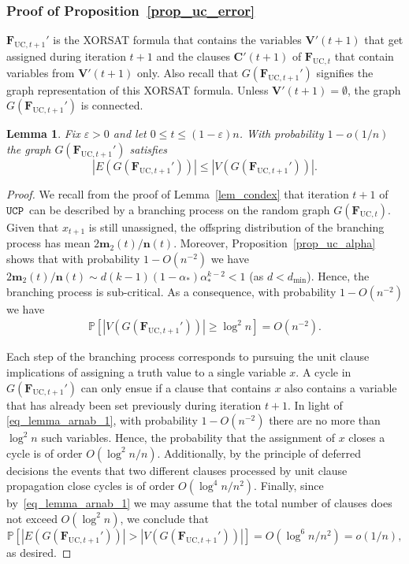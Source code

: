 \documentclass[10pt,reqno]{amsart}
\numberwithin{equation}{section}
\renewcommand{\vec}[1]{\boldsymbol{#1}}
\newcommand\dmin{d_{\mathrm{min}}}
\newcommand{\FUC}[1]{\PHI_{\mathrm{UC},{#1}}}
\newcommand{\UCP}{\ensuremath{\mathtt{UCP}}}
\newcommand\PHI{\vec F}
\newcommand\vC{\vec C}
\newcommand\vV{\vec V}
\newcommand\vm{\vec m}
\newcommand\vn{\vec n}
\newcommand\eps{\varepsilon}
\newcommand\brk[1]{\left\lbrack{#1}\right\rbrack}
\newcommand\pr{\mathbb{P}}
\newcommand\Lem{Lemma}
\newcommand\Prop{Proposition}
\newtheorem{lemma}[definition]{Lemma}
\def\pr{{\mathbb P}}
\begin{document}
\subsubsection{Proof of \Prop~\ref{prop_uc_error}}\label{sec_prop_uc_error}
$\FUC{t+1}'$ is the XORSAT formula that contains the variables $\vV'(t+1)$ that get assigned during iteration $t+1$ and the clauses $\vC'(t+1)$ of $\FUC{t}$ that contain variables from $\vV'(t+1)$ only.
Also recall that $G(\FUC{t+1}')$ signifies the graph representation of this XORSAT formula.
Unless $\vV'(t+1)=\emptyset$, the graph $G(\FUC{t+1}')$ is connected.

\begin{lemma}\label{lemma_arnab}
	Fix $\eps>0$ and let $0\leq t\leq(1-\eps)n$.
	With probability $1-o(1/n)$ the graph $G(\FUC{t+1}')$ satisfies 
			$$|E(G(\FUC{t+1}'))|\leq|V(G(\FUC{t+1}'))|.$$
\end{lemma}
\begin{proof}
	We recall from the proof of \Lem~\ref{lem_condex} that iteration $t+1$ of \UCP\ can be described by a branching process on the random graph $G(\FUC t)$.
	Given that $x_{t+1}$ is still unassigned, the offspring distribution of the branching process has mean $2\vm_2(t)/\vn(t)$.
	Moreover, \Prop~\ref{prop_uc_alpha} shows that with probability $1-O(n^{-2})$ we have $2\vm_2(t)/\vn(t)\sim d(k-1)(1-\alpha_*)  \alpha_*^{k-2}<1$ (as $d<\dmin$).
	Hence, the branching process is sub-critical.
	As a consequence, with probability $1-O(n^{-2})$ we have
	\begin{align}\label{eq_lemma_arnab_1}
		\pr\brk{|V(G(\FUC{t+1}'))|\geq\log^2n}=O(n^{-2}).
	\end{align}

	Each step of the branching process corresponds to pursuing the unit clause implications of assigning a truth value to a single variable $x$.
	A cycle in $G(\FUC{t+1}')$ can only ensue if a clause that contains $x$ also contains a variable that has already been set previously during iteration $t+1$.
	In light of \eqref{eq_lemma_arnab_1}, with probability $1-O(n^{-2})$ there are no more than $\log^2n$ such variables.
	Hence, the probability that the assignment of $x$ closes a cycle is of order $O(\log^2n/n)$.
	Additionally, by the principle of deferred decisions the events that two different clauses processed by unit clause propagation close cycles is of order $O(\log^4n/n^2)$.
	Finally, since by~\eqref{eq_lemma_arnab_1} we may assume that the total number of clauses does not exceed $O(\log^2n)$, we conclude that $$\pr\brk{|E(G(\FUC{t+1}'))|>|V(G(\FUC{t+1}'))|}=O(\log^6n/n^2)=o(1/n),$$ as desired.
\end{proof}
\end{document}
